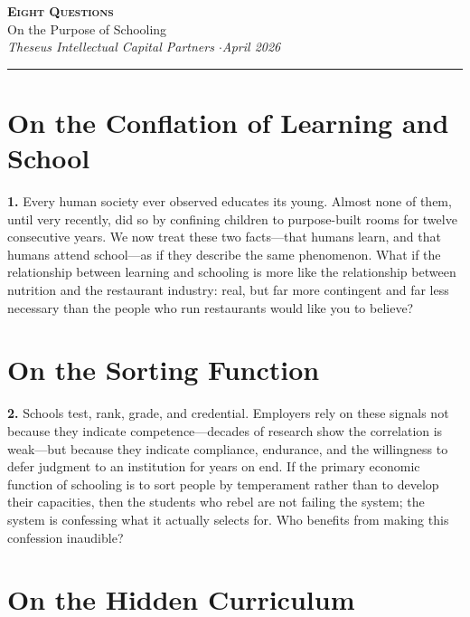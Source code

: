 \documentclass[11pt,letterpaper]{article}
\begin{document}
\thispagestyle{empty}

\vspace*{2cm}

\begin{center}
{\Large\textsc{\textbf{Eight Questions}}}\\[8pt]
{\normalsize On the Purpose of Schooling}\\[16pt]
{\small\textit{Theseus Intellectual Capital Partners \quad$\cdot$\quad April 2026}}
\end{center}

\vspace{4pt}
\noindent\rule{\textwidth}{0.4pt}
\vspace{0.8em}

\section{On the Conflation of Learning and School}

\textbf{1.}
Every human society ever observed educates its young. Almost none of them, until very recently, did so by confining children to purpose-built rooms for twelve consecutive years. We now treat these two facts---that humans learn, and that humans attend school---as if they describe the same phenomenon. What if the relationship between learning and schooling is more like the relationship between nutrition and the restaurant industry: real, but far more contingent and far less necessary than the people who run restaurants would like you to believe?

\section{On the Sorting Function}

\textbf{2.}
Schools test, rank, grade, and credential. Employers rely on these signals not because they indicate competence---decades of research show the correlation is weak---but because they indicate compliance, endurance, and the willingness to defer judgment to an institution for years on end. If the primary economic function of schooling is to sort people by temperament rather than to develop their capacities, then the students who rebel are not failing the system; the system is confessing what it actually selects for. Who benefits from making this confession inaudible?

\section{On the Hidden Curriculum}
\end{document}
